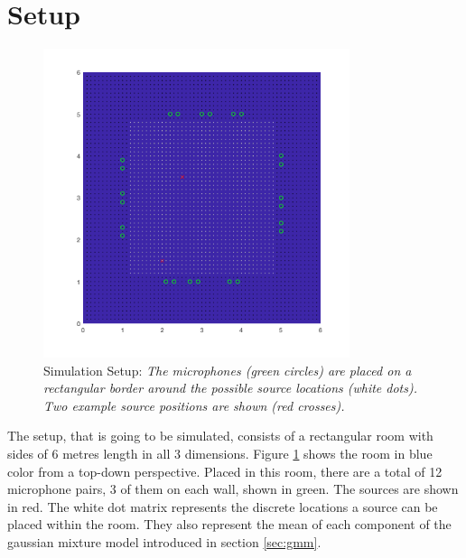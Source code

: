 \section{Setup}
\label{sec:setup}




\begin{figure}[H]
	\centering
	\includegraphics[width=0.8\textwidth]{data/plots/setup/setup-save.png}
	\caption[Simulation Setup]{Simulation Setup: \itshape The microphones (green circles) are placed on a rectangular border around the possible source locations (white dots). Two example source positions are shown (red crosses).}
	\label{fig:setup}
\end{figure}


The setup, that is going to be simulated, consists of a rectangular room with sides of 6 metres length in all 3 dimensions. Figure \ref{fig:setup} shows the room in blue color from a top-down perspective. Placed in this room, there are a total of 12 microphone pairs, 3 of them on each wall, shown in green. The sources are shown in red. The white dot matrix represents the discrete locations a source can be placed within the room. They also represent the mean of each component of the gaussian mixture model introduced in section \ref{sec:gmm}.


